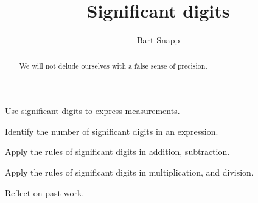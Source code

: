 \documentclass[handout,noauthor,nooutcomes,hints,12pt]{ximera}
\title{Significant digits}
\author{Bart Snapp}
\begin{document}
\begin{abstract}
We will not delude ourselves with a false sense of precision. 
\end{abstract}
\maketitle


\begin{listOutcomes}
  \item Use significant digits to express measurements.
  \item Identify the number of significant digits in an expression.
  \item Apply the rules of significant digits in addition, subtraction.
  \item Apply the rules of significant digits in multiplication, and division.
  \item{Reflect on past work.}
\end{listOutcomes}

\mynewpage
\end{document}

